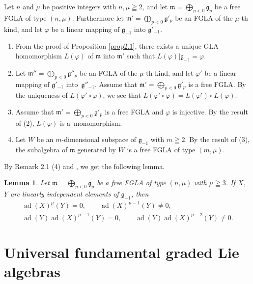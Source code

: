 \documentclass[11pt]{article}
\newtheorem{lemma}{Lemma}
\numberwithin{equation}{section}
\numberwithin{theorem}{section}
\numberwithin{proposition}{section}
\numberwithin{lemma}{section}
\numberwithin{corollary}{section}
\numberwithin{definition}{section}
\numberwithin{example}{section}
\numberwithin{remark}{section}
\numberwithin{note}{section}
\newcommand{\ad}{\operatorname{ad}}
\begin{document}
\begin{remark}
Let $n$ and $\mu$ be positive integers with $n,\mu\geqq2$, and
let $\mathfrak m=\bigoplus\limits_{p<0}\mathfrak g_p$ be a free FGLA of
type $(n,\mu)$.  Furthermore
let $\mathfrak m'=\bigoplus\limits_{p<0}\mathfrak g'_p$
be an FGLA of the $\mu$-th kind,
and let $\varphi$ be a linear mapping of $\mathfrak g_{-1}$ into
$\mathfrak g'_{-1}$.
\begin{enumerate}\itemsep=0pt
\item
From the proof of Proposition \ref{prop2.1}, there exists a unique GLA
homomorphism $L(\varphi)$ of $\mathfrak m$ into $\mathfrak m'$
such that $L(\varphi)|\mathfrak g_{-1}=\varphi$.
\item
Let $\mathfrak m''=\bigoplus\limits_{p<0}\mathfrak g''_p$
be an FGLA of the $\mu$-th kind,
and let $\varphi'$ be a linear mapping of $\mathfrak g'_{-1}$ into~$\mathfrak g''_{-1}$. Assume that $\mathfrak m'=\bigoplus\limits_{p<0}\mathfrak g'_p$ is a free FGLA. By the uniqueness of $L(\varphi'\circ\varphi)$,
we see that
$L(\varphi'\circ\varphi)=L(\varphi')\circ L(\varphi)$.
\item Assume that $\mathfrak m'=\bigoplus\limits_{p<0}\mathfrak g'_p$ is a
free FGLA and $\varphi$ is injective. By the result of (2),
$L(\varphi)$ is a~monomorphism.
\item Let $W$ be an $m$-dimensional subspace of $\mathfrak g_{-1}$ with $m\geqq2$.
By the result of (3), the subalgebra of $\mathfrak m$ generated by $W$ is a
free FGLA of type $(m,\mu)$.
\end{enumerate}
\end{remark}
By Remark 2.1 (4) and \cite[Chapter~II, \S~2, Theorem~1]{bou72:1}, we get the following lemma.
\begin{lemma}\label{lem2.1} Let $\mathfrak m=\bigoplus\limits_{p<0}\mathfrak g_p$ be a
free FGLA of type $(n,\mu)$ with $\mu\geqq3$.
If $X$, $Y$ are linearly independent elements of $\mathfrak g_{-1}$, then
\begin{gather*}
\ad(X)^\mu(Y)=0, \qquad \ad(X)^{\mu-1}(Y)\ne 0, \\
\ad(Y)\ad(X)^{\mu-1}(Y)=0, \qquad \ad(Y)\ad(X)^{\mu-2}(Y)\ne 0.
\end{gather*}
\end{lemma}

\section{Universal fundamental graded Lie algebras}\label{section3}
\end{document}
